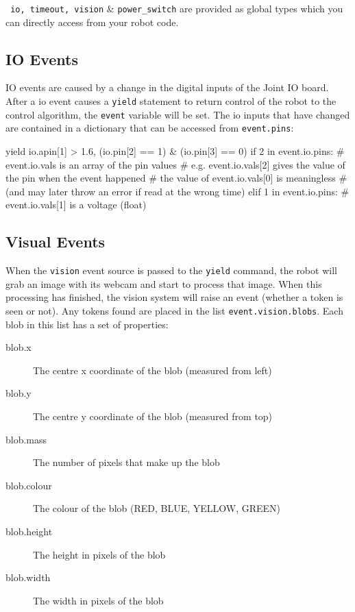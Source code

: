\documentclass[a4paper, 12pt]{article}
\begin{document}
\texttt{ io, timeout, vision} \& \texttt{power\_switch} are provided as global types which you can directly access from your robot code.

\subsection{IO Events}
IO events are caused by a change in the digital inputs of the
Joint IO board. After a io event causes a \texttt{yield} statement to
return control of the robot to the control algorithm, the
\texttt{event} variable will be set. The io inputs that have changed
are contained in a dictionary that can be accessed from \texttt{event.pins}: 

\begin{verbatimtab}
yield io.apin[1] > 1.6, (io.pin[2] == 1) & (io.pin[3] == 0)
if 2 in event.io.pins:
    # event.io.vals is an array of the pin values
    # e.g. event.io.vals[2] gives the value of the pin when the event happened
    # the value of event.io.vals[0] is meaningless
    # (and may later throw an error if read at the wrong time)
elif 1 in event.io.pins:
    # event.io.vals[1] is a voltage (float)
\end{verbatimtab}


\subsection{Visual Events}
When the \texttt{vision} event source is passed to the \texttt{yield}
command, the robot will grab an image with its webcam and start to
process that image.  When this processing has finished, the vision
system will raise an event (whether a token is seen or not).  Any
tokens found are placed in the list \texttt{event.vision.blobs}.  Each blob in this
list has a set of properties:  
\begin{description}
\item[blob.x] The centre x coordinate of the blob (measured from left)
\item[blob.y] The centre y coordinate of the blob (measured from top)
\item[blob.mass] The number of pixels that make up the blob
\item[blob.colour] The colour of the blob (RED, BLUE, YELLOW, GREEN)
\item[blob.height] The height in pixels of the blob
\item[blob.width] The width in pixels of the blob
\end{description}
\end{document}
